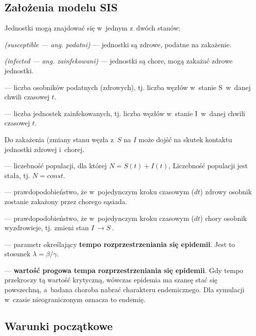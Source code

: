 \subsection{Założenia modelu SIS}
\label{subsec:zalozenia_modelu_sis}

\begin{description} \itemsep0pt
\item[$\bullet$] Jednostki mogą znajdować się w~jednym z~dwóch stanów:
  \begin{description} \itemsep0pt
  \item[S] \textit{(susceptible --- ang. podatni)} --- jednostki są zdrowe, podatne na zakażenie.
  \item[I] \textit{(infected --- ang. zainfekowani)} --- jednostki są chore, mogą zakażać zdrowe jednostki.
  \end{description}
\item[S(t)] --- liczba osobników podatnych (zdrowych), tj. liczba węzłów w~stanie S~w~danej chwili czasowej $t$.
\item[I(t)] --- liczba jednostek zainfekowanych, tj. liczba węzłów w~stanie I~w~danej chwili czasowej $t$.
\item[$\bullet$] Do zakażenia (zmiany stanu węzła z~$S$ na $I$ może dojść na skutek kontaktu jednostki zdrowej i~chorej.
\item[N] --- liczebność populacji, dla której $N = S(t) + I(t)$, Liczebność populacji jest stała, tj. $N = \textit{const.}$

\item[$\pmb{\beta}$] --- prawdopodobieństwo, że w~pojedynczym kroku czasowym ($dt$) zdrowy osobnik zostanie zakażony przez chorego sąsiada.
\item[$\pmb{\gamma}$] --- prawdopodobieństwo, że w~pojedynczym kroku czasowym ($dt$) chory osobnik wyzdrowieje, tj. zmieni stan $ I~\rightarrow S~$.
\item[$\pmb{\lambda}$] --- parametr określający \textbf{tempo rozprzestrzeniania się epidemii}. Jest to stosunek $\lambda = \beta / \gamma $.
\item[$\pmb{\lambda_c}$] --- \textbf{wartość progowa tempa rozprzestrzeniania się epidemii}. Gdy tempo przekroczy tą wartość krytyczną, wówczas epidemia ma szansę stać się powszechną, a~badana choroba nabrać charakteru endemicznego. Dla symulacji w~czasie nieograniczonym oznacza to endemię.

\end{description}


\subsection{Warunki początkowe}
\label{subsec:warunki_poczatkowe}

